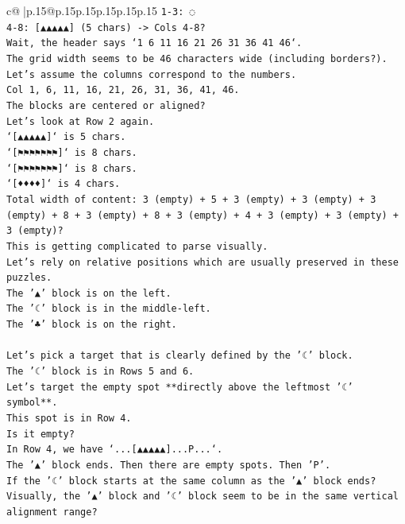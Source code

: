 \documentclass{article}
\begin{document}
{\begin{supertabular}{c@{$\;$}|p{.15\linewidth}@{}p{.15\linewidth}p{.15\linewidth}p{.15\linewidth}p{.15\linewidth}p{.15\linewidth}}
{{{\texttt{1{-}3: ◌} \\
\texttt{4{-}8: {[}▲▲▲▲▲{]} (5 chars) {-}> Cols 4{-}8?} \\
\texttt{Wait, the header says `1 6 11 16 21 26 31 36 41 46`.} \\
\texttt{The grid width seems to be 46 characters wide (including borders?).} \\
\texttt{Let's assume the columns correspond to the numbers.} \\
\texttt{Col 1, 6, 11, 16, 21, 26, 31, 36, 41, 46.} \\
\texttt{The blocks are centered or aligned?} \\
\texttt{Let's look at Row 2 again.} \\
\texttt{`{[}▲▲▲▲▲{]}` is 5 chars.} \\
\texttt{`{[}⚑⚑⚑⚑⚑⚑⚑{]}` is 8 chars.} \\
\texttt{`{[}⚑⚑⚑⚑⚑⚑⚑{]}` is 8 chars.} \\
\texttt{`{[}♦♦♦♦{]}` is 4 chars.} \\
\texttt{Total width of content: 3 (empty) + 5 + 3 (empty) + 3 (empty) + 3 (empty) + 8 + 3 (empty) + 8 + 3 (empty) + 4 + 3 (empty) + 3 (empty) + 3 (empty)?} \\
\texttt{This is getting complicated to parse visually.} \\
\texttt{Let's rely on relative positions which are usually preserved in these puzzles.} \\
\texttt{The '▲' block is on the left.} \\
\texttt{The '☾' block is in the middle{-}left.} \\
\texttt{The '♣' block is on the right.} \\
\\ 
\texttt{Let's pick a target that is clearly defined by the '☾' block.} \\
\texttt{The '☾' block is in Rows 5 and 6.} \\
\texttt{Let's target the empty spot **directly above the leftmost '☾' symbol**.} \\
\texttt{This spot is in Row 4.} \\
\texttt{Is it empty?} \\
\texttt{In Row 4, we have `...{[}▲▲▲▲▲{]}...P...`.} \\
\texttt{The '▲' block ends. Then there are empty spots. Then 'P'.} \\
\texttt{If the '☾' block starts at the same column as the '▲' block ends?} \\
\texttt{Visually, the '▲' block and '☾' block seem to be in the same vertical alignment range?} \\
}}}
\end{supertabular}}
\end{document}
